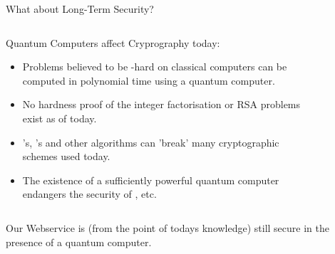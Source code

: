 \begin{frame}{What about Long-Term Security?}
  \begin{columns}
    \begin{column}{0.6\linewidth}
      Quantum Computers affect Cryprography today:
      \begin{itemize}
        \item Problems believed to be -hard on classical computers can be computed in polynomial time using a quantum computer.
        \item No hardness proof of the integer factorisation or RSA problems exist as of today.
        \item {}'s, 's and other algorithms can 'break' many cryptographic schemes used today.
        \item The existence of a sufficiently powerful quantum computer endangers the security of , etc.
      \end{itemize}
    \end{column}
    \begin{column}{0.4\linewidth}
      \vspace{-0.3cm}
      \begin{figure}[H]
        \centering
        \label{fig:wave-function}
      \end{figure}
    \end{column}
  \end{columns}
  Our Webservice is (from the point of todays knowledge) still secure in the presence of a quantum computer.
\end{frame}
